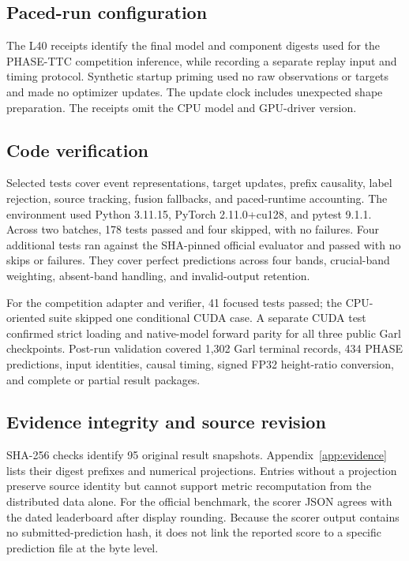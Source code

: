 \subsection{Paced-run configuration}
The L40 receipts identify the final model and component digests used for the PHASE-TTC competition inference, while recording a separate replay input and timing protocol. Synthetic startup priming used no raw observations or targets and made no optimizer updates. The update clock includes unexpected shape preparation. The receipts omit the CPU model and GPU-driver version. 


\subsection{Code verification}

Selected tests cover event representations, target updates, prefix causality,
label rejection, source tracking, fusion fallbacks, and paced-runtime accounting.
The environment used Python 3.11.15, PyTorch 2.11.0+cu128, and pytest 9.1.1.
Across two batches, 178 tests passed and four skipped, with no failures. Four
additional tests ran against the SHA-pinned official evaluator and passed with
no skips or failures. They cover perfect predictions across four bands,
crucial-band weighting, absent-band handling, and invalid-output retention.

For the competition adapter and verifier, 41 focused tests passed; the
CPU-oriented suite skipped one conditional CUDA case. A separate CUDA test
confirmed strict loading and native-model forward parity for all three public
Garl checkpoints. Post-run validation covered 1,302 Garl terminal records, 434
PHASE predictions, input identities, causal timing, signed FP32 height-ratio
conversion, and complete or partial result packages. 

\subsection{Evidence integrity and source revision}

SHA-256 checks identify 95 original result snapshots.
Appendix~\ref{app:evidence} lists their digest prefixes and numerical projections.
Entries without a projection preserve source identity but cannot support metric
recomputation from the distributed data alone. For the official benchmark, the
scorer JSON agrees with the dated leaderboard after display rounding. Because
the scorer output contains no submitted-prediction hash, it does not link the
reported score to a specific prediction file at the byte level.

